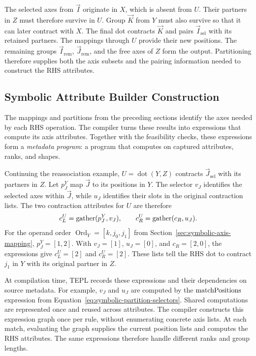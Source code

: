 The selected axes from $\vec I$ originate in $X$, which is absent
from $U$. Their partners in $Z$ must therefore survive in $U$.
Group $\vec K$ from $Y$ must also survive so that it can later
contract with $X$.
The final dot contracts $\vec K$ and pairs
$\vec I_{\mathrm{sel}}$ with its retained partners.
The mappings through $U$ provide their new positions.
The remaining groups $\vec I_{\mathrm{rem}}$,
$\vec J_{\mathrm{rem}}$, and the free axes of $Z$ form the output.
Partitioning therefore supplies both the axis subsets and the pairing
information needed to construct the RHS attributes.

\subsection{Symbolic Attribute Builder Construction}
\label{sec:symbolic-attribute-builder-construction}
The mappings and partitions from the preceding sections identify the
axes needed by each RHS operation. The compiler turns these results
into expressions that compute its axis attributes. Together with the
feasibility checks, these expressions form a \emph{metadata program}:
a program that computes on captured attributes, ranks, and shapes.

Continuing the reassociation example, $U=\operatorname{dot}(Y,Z)$
contracts $\vec J_{\mathrm{sel}}$ with its partners in $Z$.
Let $p_J^Y$ map $\vec J$ to its positions in $Y$.
The selector $v_J$ identifies the selected axes within $\vec J$,
while $u_J$ identifies their slots in the original contraction lists.
The two contraction attributes for $U$ are therefore
\begin{equation}
 c_L^U=\operatorname{gather}(p_J^Y,v_J),\qquad
 c_R^U=\operatorname{gather}(c_R,u_J).
 \label{eq:builder-contraction-example}
\end{equation}
For the operand order $\operatorname{Ord}_Y=[k,j_0,j_1]$ from
Section~\ref{sec:symbolic-axis-mapping}, $p_J^Y=[1,2]$.
With $v_J=[1]$, $u_J=[0]$, and $c_R=[2,0]$, the expressions give
$c_L^U=[2]$ and $c_R^U=[2]$. These lists tell the RHS dot to contract
$j_1$ in $Y$ with its original partner in $Z$.

At compilation time, TEPL records these expressions and their
dependencies on source metadata. For example, $v_J$ and $u_J$ are
computed by the $\operatorname{matchPositions}$ expression from
Equation~\eqref{eq:symbolic-partition-selectors}.
Shared computations are represented once and reused across attributes.
The compiler constructs this expression graph once per rule, without
enumerating concrete axis lists. At each match, evaluating the graph
supplies the current position lists and computes the RHS attributes.
The same expressions therefore handle different ranks and group lengths.

